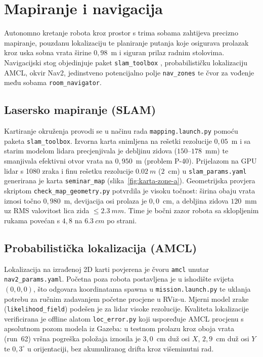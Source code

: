 \section{Mapiranje i navigacija}
\label{sec:06-navigacija}

Autonomno kretanje robota kroz prostor s trima sobama zahtijeva precizno mapiranje, pouzdanu
lokalizaciju te planiranje putanja koje osigurava prolazak kroz uska sobna vrata širine $0{,}98$~m
i siguran prilaz radnim stolovima. Navigacijski stog objedinjuje paket \texttt{slam\_toolbox}
\cite{mail2026}, probabilističku lokalizaciju AMCL, okvir Nav2, jedinstveno potencijalno polje
\texttt{nav\_zones} te čvor za vođenje među sobama \texttt{room\_navigator}.

\subsection{Lasersko mapiranje (SLAM)}
\label{sec:06-slam}

Kartiranje okruženja provodi se u načinu rada \texttt{mapping.launch.py} pomoću paketa
\texttt{slam\_toolbox}. Izvorna karta snimljena na rešetki rezolucije $0{,}05$~m i sa starim modelom
lidara precjenjivala je debljinu zidova ($150$--$178$~mm) te smanjivala efektivni otvor vrata na
$0{,}950$~m (problem P-40). Prijelazom na GPU lidar s 1080 zraka i finu rešetku rezolucije
$\SI{0.02}{m}$ ($2$~cm) u \texttt{slam\_params.yaml} generirana je karta \texttt{seminar\_map}
(slika~\ref{fig:karta-zone-a}). Geometrijska provjera skriptom \texttt{check\_map\_geometry.py}
potvrdila je visoku točnost: širina obaju vrata iznosi točno $0{,}980$~m, devijacija osi prolaza je
$0{,}0$~cm, a debljina zidova $120$~mm uz RMS valovitost lica zida $\le \SI{2.3}{mm}$. Time je bočni
zazor robota sa sklopljenim rukama povećan s $4{,}8$ na $\SI{6.3}{cm}$ po strani.

\subsection{Probabilistička lokalizacija (AMCL)}
\label{sec:06-amcl}

Lokalizacija na izrađenoj 2D karti povjerena je čvoru \texttt{amcl} unutar \texttt{nav2\_params.yaml}.
Početna poza robota postavljena je u ishodište svijeta $(0, 0, 0)$, što odgovara koordinatama
spawna u \texttt{mission.launch.py} te uklanja potrebu za ručnim zadavanjem početne procjene u
RViz-u. Mjerni model zrake (\texttt{likelihood\_field}) podešen je za lidar visoke rezolucije.
Kvaliteta lokalizacije verificirana je offline alatom \texttt{loc\_error.py} koji uspoređuje AMCL
procjenu s apsolutnom pozom modela iz Gazeba: u testnom prolazu kroz oboja vrata (run~62) vršna
pogreška položaja iznosila je $3{,}0$~cm duž osi $X$, $2{,}9$~cm duž osi $Y$ te $0{,}3^\circ$ u
orijentaciji, bez akumuliranog drifta kroz višeminutni rad.


